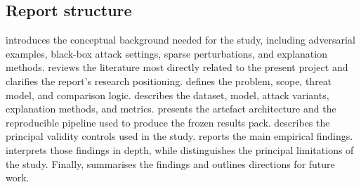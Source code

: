 \subsection{Report structure}
 introduces the conceptual background needed for the study, including adversarial examples, black-box attack settings, sparse perturbations, and explanation methods.
 reviews the literature most directly related to the present project and clarifies the report's research positioning.
 defines the problem, scope, threat model, and comparison logic.
 describes the dataset, model, attack variants, explanation methods, and metrics.
 presents the artefact architecture and the reproducible pipeline used to produce the frozen results pack.
 describes the principal validity controls used in the study.
 reports the main empirical findings.
 interprets those findings in depth, while  distinguishes the principal limitations of the study.
Finally,  summarises the findings and outlines directions for future work.
